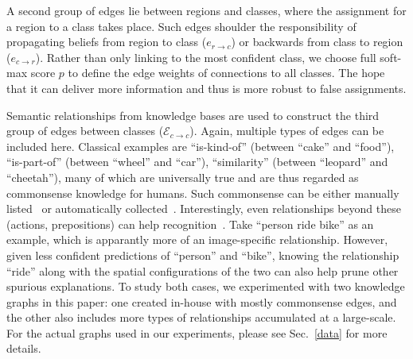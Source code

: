 \documentclass[10pt,twocolumn,letterpaper]{article}
\begin{document}
A second group of edges lie between regions and classes, where the assignment for a region to a class takes place. Such edges shoulder the responsibility of propagating beliefs from region to class ($e_{r{\rightarrow}c}$) or backwards from class to region ($e_{c{\rightarrow}r}$). Rather than only linking to the most confident class, we choose full soft-max score $p$ to define the edge weights of connections to all classes. The hope that it can deliver more information and thus is more robust to false assignments. 

Semantic relationships from knowledge bases are used to construct the third group of edges between classes ($\mathcal{E}_{c{\rightarrow}c}$). Again, multiple types of edges can be included here. Classical examples are ``is-kind-of'' (\eg between ``cake'' and ``food''), ``is-part-of'' (\eg between ``wheel'' and ``car''), ``similarity'' (\eg between ``leopard'' and ``cheetah''), many of which are universally true and are thus regarded as commonsense knowledge for humans. Such commonsense can be either manually listed~\cite{russakovsky2015imagenet} or automatically collected~\cite{chen2013neil}. Interestingly, even relationships beyond these (\eg actions, prepositions) can help recognition~\cite{marino2016more}. Take ``person ride bike'' as an example, which is apparantly more of an image-specific relationship. However, given less confident predictions of ``person'' and ``bike'', knowing the relationship ``ride'' along with the spatial configurations of the two can also help prune other spurious explanations. To study both cases, we experimented with two knowledge graphs in this paper: one created in-house with mostly commonsense edges, and the other also includes more types of relationships accumulated at a large-scale. For the actual graphs used in our experiments, please see Sec.~\ref{data} for more details.
\end{document}
